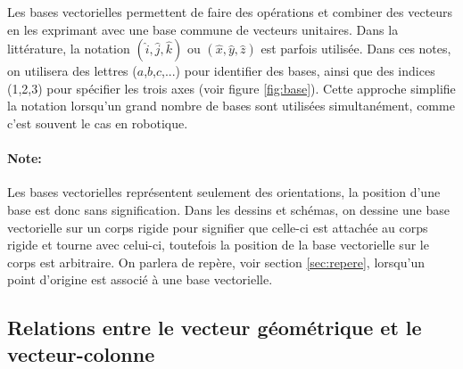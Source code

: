 Les bases vectorielles permettent de faire des opérations et combiner des vecteurs en les exprimant avec une base commune de vecteurs unitaires. Dans la littérature, la notation $(\hat{i},\hat{j},\hat{k})$ ou $(\hat{x},\hat{y},\hat{z})$ est parfois utilisée. Dans ces notes, on utilisera des lettres ($a$,$b$,$c$,...) pour identifier des bases, ainsi que des indices (1,2,3) pour spécifier les trois axes (voir figure \ref{fig:base}). Cette approche simplifie la notation lorsqu'un grand nombre de bases sont utilisées simultanément, comme c'est souvent le cas en robotique.

\paragraph{Note:} Les bases vectorielles représentent seulement des orientations, la position d'une base est donc sans signification. Dans les dessins et schémas, on dessine une base vectorielle sur un corps rigide pour signifier que celle-ci est attachée au corps rigide et tourne avec celui-ci, toutefois la position de la base vectorielle sur le corps est arbitraire. On parlera de repère, voir section \ref{sec:repere}, lorsqu'un point d'origine est associé à une base vectorielle. 




\subsection{Relations entre le vecteur géométrique et le vecteur-colonne}

